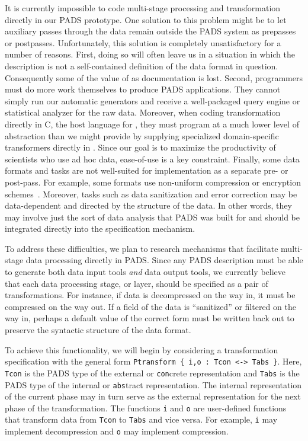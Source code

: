 It is currently impossible to code multi-stage processing and transformation
directly in our PADS prototype.  One solution
to this problem might be to let auxiliary passes through the data
remain outside the PADS system as prepasses or postpasses.  
Unfortunately, this solution is completely unsatisfactory for a
number of reasons.  First, doing so
will often leave us in a situation in which the \pads{} description 
is not a self-contained
definition of the data format in question.  Consequently some of the value
of \pads{} as documentation is lost.  
Second, programmers must do
more work themselves to produce PADS applications.  They cannot
simply run our automatic generators and receive a well-packaged 
query engine or statistical analyzer for the raw data.
Moreover, when coding transformation directly in C, the host language
for \pads{}, they must program at a much lower level of abstraction
than we might provide by supplying specialized domain-specific
transformers directly in \pads.
Since our goal is to maximize the productivity of scientists 
who use ad hoc data, ease-of-use is a key constraint.
Finally, some data formats and
tasks are not well-suited for implementation as a separate pre- or post-pass.
For example, some formats use non-uniform compression or encryption 
schemes~\cite{korn+:delta,korn+:data-format}.
Moreover, tasks such as data sanitization and error correction may be
data-dependent and directed by the structure of the data.  In other words,
they may involve just the sort of data analysis that PADS was built for
and should be integrated directly into the specification mechanism.

To address these difficulties,
we plan to research mechanisms that facilitate multi-stage data processing 
directly in PADS.  Since any PADS description must be able to generate 
both data
input tools {\em and} data output tools, we currently believe that each
data processing stage, or layer, should be specified as a pair of
transformations.  For instance, if data is decompressed on the way in,
it must be compressed on the way out.  If a field of the data is ``sanitized''
or filtered on the way in, perhaps a default value of the correct form must
be written back out to preserve the syntactic structure of the data format.

To achieve this functionality, we will begin by considering a
transformation specification with the general form 
\texttt{Ptransform \{ i,o :  Tcon <-> Tabs \}}.
Here, {\tt Tcon} is the PADS type of the external or {\tt con}crete
representation and {\tt Tabs} is the PADS type of the internal or 
{\tt abs}tract representation.  The internal representation of the current
phase may in turn serve as the external representation for the next
phase of the transformation.  The functions {\tt i} and {\tt o} are
user-defined functions that transform data from {\tt Tcon} to 
{\tt Tabs} and vice versa.  For example, {\tt i} may implement
decompression and {\tt o} may implement compression.

